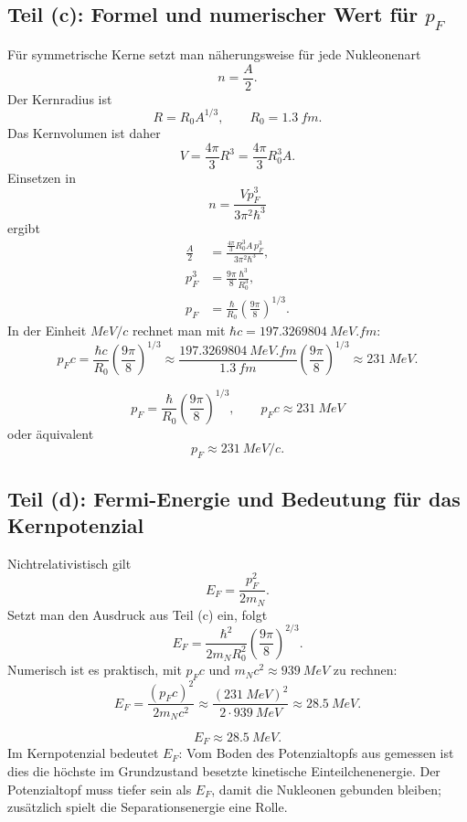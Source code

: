 \documentclass[11pt,a4paper]{scrartcl}
\newcommand{\paren}[1]{\left( #1 \right)}
\newcommand{\MeV}{\si{MeV}}
\theoremstyle{definition}
\theoremstyle{plain}
\theoremstyle{remark}
\begin{document}
\subsection{Teil (c): Formel und numerischer Wert für \texorpdfstring{$p_F$}{pF}}

\begin{calculationbox}
Für symmetrische Kerne setzt man näherungsweise für jede Nukleonenart
\[
    n=\frac{A}{2}.
\]
Der Kernradius ist
\[
    R=R_0A^{1/3}, \qquad R_0=\SI{1.3}{fm}.
\]
Das Kernvolumen ist daher
\[
    V=\frac{4\pi}{3}R^3=\frac{4\pi}{3}R_0^3A.
\]
Einsetzen in
\[
    n=\frac{Vp_F^3}{3\pi^2\hbar^3}
\]
ergibt
\begin{align*}
    \frac{A}{2}
    &= \frac{\frac{4\pi}{3}R_0^3A\,p_F^3}{3\pi^2\hbar^3},\\
    p_F^3
    &= \frac{9\pi}{8}\frac{\hbar^3}{R_0^3},\\
    p_F
    &= \frac{\hbar}{R_0}\paren{\frac{9\pi}{8}}^{1/3}.
\end{align*}
In der Einheit \(\MeV/c\) rechnet man mit \(\hbar c=\SI{197.3269804}{MeV.fm}\):
\[
    p_Fc
    = \frac{\hbar c}{R_0}\paren{\frac{9\pi}{8}}^{1/3}
    \approx \frac{\SI{197.3269804}{MeV.fm}}{\SI{1.3}{fm}}\paren{\frac{9\pi}{8}}^{1/3}
    \approx \SI{231}{MeV}.
\]
\end{calculationbox}

\begin{answerbox}
\[
    \boxed{p_F=\frac{\hbar}{R_0}\paren{\frac{9\pi}{8}}^{1/3}},
    \qquad
    \boxed{p_Fc\approx \SI{231}{MeV}}
\]
oder äquivalent
\[
    \boxed{p_F\approx \SI{231}{MeV/c}}.
\]
\end{answerbox}

\subsection{Teil (d): Fermi-Energie und Bedeutung für das Kernpotenzial}

\begin{calculationbox}
Nichtrelativistisch gilt
\[
    E_F=\frac{p_F^2}{2m_N}.
\]
Setzt man den Ausdruck aus Teil (c) ein, folgt
\[
    E_F
    = \frac{\hbar^2}{2m_NR_0^2}\paren{\frac{9\pi}{8}}^{2/3}.
\]
Numerisch ist es praktisch, mit \(p_Fc\) und \(m_Nc^2\approx\SI{939}{MeV}\) zu rechnen:
\[
    E_F
    =\frac{(p_Fc)^2}{2m_Nc^2}
    \approx \frac{(\SI{231}{MeV})^2}{2\cdot\SI{939}{MeV}}
    \approx \SI{28.5}{MeV}.
\]
\end{calculationbox}

\begin{answerbox}
\[
    \boxed{E_F\approx \SI{28.5}{MeV}}.
\]
Im Kernpotenzial bedeutet \(E_F\): Vom Boden des Potenzialtopfs aus gemessen ist dies die höchste im Grundzustand besetzte kinetische Einteilchenenergie. Der Potenzialtopf muss tiefer sein als \(E_F\), damit die Nukleonen gebunden bleiben; zusätzlich spielt die Separationsenergie eine Rolle.
\end{answerbox}
\end{document}
